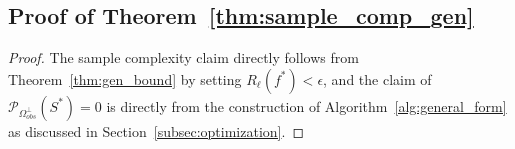 \documentclass[twoside,11pt]{article}
\def\Obs{\Omega_{obs}}
\newcommand\proj[1]{{\mathcal P}_{#1}}
\def\optS{S^*}
\begin{document}
\subsection*{Proof of Theorem~\ref{thm:sample_comp_gen}}
\begin{proof}
  The sample complexity claim directly follows from Theorem~\ref{thm:gen_bound} by setting $R_\ell(f^*) < \epsilon$,
  and the claim of $\proj{\Obs^\perp}(\optS) = 0$ is directly from the construction of
  Algorithm~\ref{alg:general_form} as discussed in Section~\ref{subsec:optimization}.
\end{proof}

\vskip 0.2in

\end{document}
